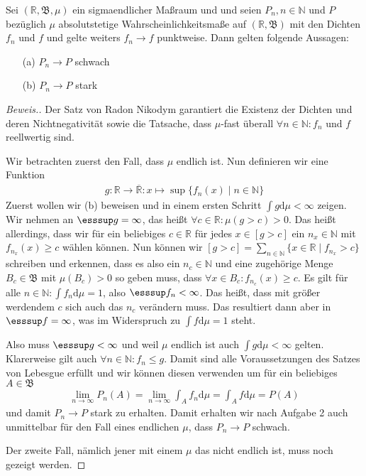 \begin{lemma}
    Sei $(\mathbb{R},\mathfrak{B},\mu)$ ein sigmaendlicher Maßraum und und seien $P_n,n\in\mathbb{N}$ und $P$ bezüglich $\mu$ absolutstetige Wahrscheinlichkeitsmaße auf $(\mathbb{R},\mathfrak{B})$ mit den Dichten $f_n$ und $f$ und gelte weiters $f_n\to f$ punktweise. Dann gelten folgende Aussagen:
    \begin{itemize}
        \item[(a)] $P_n\to P$ schwach
        \item[(b)] $P_n\to P$ stark 
    \end{itemize}
\end{lemma}
\begin{proof}[Beweis.]
    Der Satz von Radon Nikodym \cite[Satz 11.19]{zbMATH06257850} garantiert die Existenz der Dichten und deren Nichtnegativität sowie die Tatsache, dass $\mu$-fast überall $\forall n\in\mathbb{N}:f_n$ und $f$ reellwertig sind.
    
    Wir betrachten zuerst den Fall, dass $\mu$ endlich ist. Nun definieren wir eine Funktion
    \begin{align*}
        g:\mathbb{R}\to\overline{\mathbb{R}}:x\mapsto\sup\{f_n(x)\mid n\in\mathbb{N}\}
    \end{align*}
    Zuerst wollen wir (b) beweisen und in einem ersten Schritt $\int g\mathrm{d}\mu<\infty$ zeigen. Wir nehmen an $\esssup g=\infty$, das heißt $\forall c\in\mathbb{R}:\mu(g>c)>0$. Das heißt allerdings, dass wir für ein beliebiges $c\in\mathbb{R}$ für jedes $x\in[g>c]$ ein $n_x\in\mathbb{N}$ mit $f_{n_x}(x)\geq c$ wählen können. Nun können wir $[g>c]=\sum_{n\in\mathbb{N}}\{x\in\mathbb{R}\mid f_{n_x}>c\}$ schreiben und erkennen, dass es also ein $n_c\in\mathbb{N}$ und eine zugehörige Menge $B_c\in\mathfrak{B}$ mit $\mu(B_c)>0$ so geben muss, dass $\forall x\in B_c:f_{n_c}(x)\geq c$. Es gilt für alle $n\in\mathbb{N}:\int f_n\mathrm{d}\mu=1$, also $\esssup f_n<\infty$. Das heißt, dass mit größer werdendem $c$ sich auch das $n_c$ verändern muss. Das resultiert dann aber in $\esssup f=\infty$, was im Widerspruch zu $\int f\mathrm{d}\mu=1$ steht. 
    
    Also muss $\esssup g<\infty$ und weil $\mu$ endlich ist auch $\int g\mathrm{d}\mu<\infty$ gelten. Klarerweise gilt auch $\forall n\in\mathbb{N}:f_n\leq g$. Damit sind alle Voraussetzungen des Satzes von Lebesgue \cite[Satz 9.33]{zbMATH06257850} erfüllt und wir können diesen verwenden um für ein beliebiges $A\in\mathfrak{B}$
    \begin{align*}
        \lim_{n\to\infty}P_n(A)=\lim_{n\to\infty}\int_Af_n\mathrm{d}\mu=\int_A f\mathrm{d}\mu=P(A)
    \end{align*}
    und damit $P_n\to P$ stark zu erhalten. Damit erhalten wir nach Aufgabe 2 auch unmittelbar für den Fall eines endlichen $\mu$, dass $P_n\to P$ schwach.

    Der zweite Fall, nämlich jener mit einem $\mu$ das nicht endlich ist, muss noch gezeigt werden.
\end{proof}